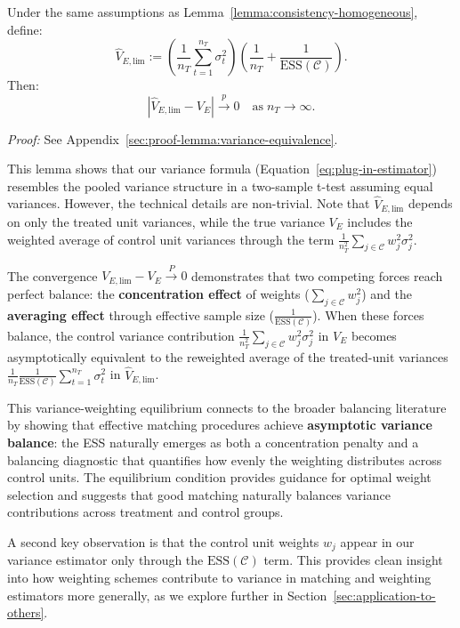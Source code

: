 \documentclass{mytemplate}
\begin{document}
\begin{lemma}
\label{lemma:variance-equivalence}
Under the same assumptions as Lemma~\ref{lemma:consistency-homogeneous}, define:
\[
\hat{V}_{E,\text{lim}} := \left( \frac{1}{n_T} \sum_{t=1}^{n_T} \sigma_t^2 \right) \left( \frac{1}{n_T} + \frac{1}{\text{ESS}(\mathcal{C})} \right).
\]
Then:
\[
\left|\hat{V}_{E,\text{lim}} - V_E \right| \xrightarrow{p} 0 \quad \text{as} \; n_T \rightarrow \infty.
\]
\end{lemma}

\textit{Proof:} See Appendix~\ref{sec:proof-lemma:variance-equivalence}.

This lemma shows that our variance formula (Equation~\ref{eq:plug-in-estimator}) resembles the pooled variance structure in a two-sample t-test assuming equal variances. However, the technical details are non-trivial. Note that $\hat{V}_{E,\text{lim}}$ depends on only the treated unit variances, while the true variance $V_E$ includes the weighted average of control unit variances through the term $\frac{1}{n_T^2} \sum_{j \in \mathcal{C}} w_j^2 \sigma_j^2$.

The convergence $V_{E,\text{lim}} - V_E \xrightarrow{P} 0$ demonstrates that two competing forces reach perfect balance: the \textbf{concentration effect} of weights ($\sum_{j \in \mathcal{C}} w_j^2$) and the \textbf{averaging effect} through effective sample size ($\frac{1}{\text{ESS}(\mathcal{C})}$). When these forces balance, the control variance contribution $\frac{1}{n_T^2} \sum_{j \in \mathcal{C}} w_j^2 \sigma_j^2$ in $V_E$ becomes asymptotically equivalent to the reweighted average of the treated-unit variances $\frac{1}{n_T} \frac{1}{\text{ESS}(\mathcal{C})} \sum_{t=1}^{n_T} \sigma_t^2$ in $\hat{V}_{E,\text{lim}}$.

This variance-weighting equilibrium connects to the broader balancing literature by showing that effective matching procedures achieve \textbf{asymptotic variance balance}: the ESS naturally emerges as both a concentration penalty and a balancing diagnostic that quantifies how evenly the weighting distributes across control units. The equilibrium condition provides guidance for optimal weight selection and suggests that good matching naturally balances variance contributions across treatment and control groups.

A second key observation is that the control unit weights $w_j$ appear in our variance estimator only through the $\text{ESS}(\mathcal{C})$ term. This provides clean insight into how weighting schemes contribute to variance in matching and weighting estimators more generally, as we explore further in Section~\ref{sec:application-to-others}.
\end{document}

